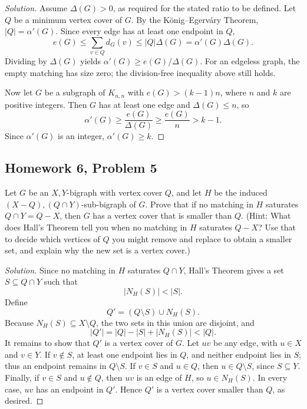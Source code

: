 \documentclass[12pt]{amsart}
\newenvironment{solution}{\begin{proof}[Solution]}{\end{proof}}
\begin{document}
    \begin{solution}
        Assume \(\Delta(G)>0\), as required for the stated ratio to be
        defined. Let \(Q\) be a minimum vertex cover of \(G\). By the
        K\"onig--Egerv\'ary Theorem, \(|Q|=\alpha'(G)\). Since every
        edge has at least one endpoint in \(Q\),
        \[
            e(G)\leq \sum_{v\in Q}d_G(v)
            \leq |Q|\Delta(G)=\alpha'(G)\Delta(G).
        \]
        Dividing by \(\Delta(G)\) yields
        \(\alpha'(G)\geq e(G)/\Delta(G)\).
        For an edgeless graph, the empty matching has size zero; the
        division-free inequality above still holds.

        Now let \(G\) be a subgraph of \(K_{n,n}\) with
        \(e(G)>(k-1)n\), where \(n\) and \(k\) are positive integers.
        Then \(G\) has at least one edge and \(\Delta(G)\leq n\), so
        \[
            \alpha'(G)\geq \frac{e(G)}{\Delta(G)}
            \geq \frac{e(G)}{n}>k-1.
        \]
        Since \(\alpha'(G)\) is an integer, \(\alpha'(G)\geq k\).
    \end{solution}

    \subsection*{Homework 6, Problem 5} Let \(G\) be an \(X,Y\)-bigraph with vertex cover \(Q\), and let
    \(H\) be the induced \((X-Q),(Q\cap Y)\)-sub-bigraph of \(G\).
    Prove that if no matching in \(H\) saturates \(Q\cap Y=Q-X\),
    then \(G\) has a vertex cover that is smaller than \(Q\).
    (Hint: What does Hall's Theorem tell you when no matching in
    \(H\) saturates \(Q-X\)? Use that to decide which vertices of \(Q\)
    you might remove and replace to obtain a smaller set, and explain
    why the new set is a vertex cover.)

    \begin{solution}
        Since no matching in \(H\) saturates \(Q\cap Y\), Hall's
        Theorem gives a set \(S\subseteq Q\cap Y\) such that
        \[
            |N_H(S)|<|S|.
        \]
        Define
        \[
            Q'=(Q\setminus S)\cup N_H(S).
        \]
        Because \(N_H(S)\subseteq X\setminus Q\), the two sets in this
        union are disjoint, and
        \[
            |Q'|=|Q|-|S|+|N_H(S)|<|Q|.
        \]
        It remains to show that \(Q'\) is a vertex cover of \(G\).
        Let \(uv\) be any edge, with \(u\in X\) and \(v\in Y\).
        If \(v\notin S\), at least one endpoint lies in \(Q\), and
        neither endpoint lies in \(S\); thus an endpoint remains in
        \(Q\setminus S\). If \(v\in S\) and \(u\in Q\), then
        \(u\in Q\setminus S\), since \(S\subseteq Y\). Finally, if
        \(v\in S\) and \(u\notin Q\), then \(uv\) is an edge of
        \(H\), so \(u\in N_H(S)\). In every case, \(uv\) has an
        endpoint in \(Q'\). Hence \(Q'\) is a vertex cover smaller
        than \(Q\), as desired.
    \end{solution}
\end{document}
